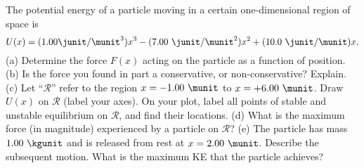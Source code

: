 The potential energy of a particle moving
in a certain one-dimensional region of space is
\begin{equation*}
  U(x) = (1.00 \junit/\munit^3) x^3 - (7.00\ \junit/\munit^2) x^2 + (10.0\ \junit/\munit) x.
\end{equation*}
%
(a) Determine the force $F(x)$ acting on the particle as a function of
position.\answercheck\hwendpart
%
(b) Is the force you found in part a conservative, or non-conservative?
Explain.
%
(c) Let ``$\mathcal{R}$'' refer to the region $x = -1.00\ \munit$
to $x= + 6.00\ \munit$.
Draw $U(x)$ on $\mathcal{R}$ (label your axes). On your plot,
label all points of stable and unstable equilibrium on $\mathcal{R}$,
and find their locations.
%
(d) What is the maximum force (in magnitude) experienced by a
particle on $\mathcal{R}$?\answercheck\hwendpart
%
(e) The particle has mass $1.00\ \kgunit$ and is released from rest at
$x=2.00\ \munit$. Describe the subsequent motion. What is the maximum
KE that the particle achieves?\answercheck
